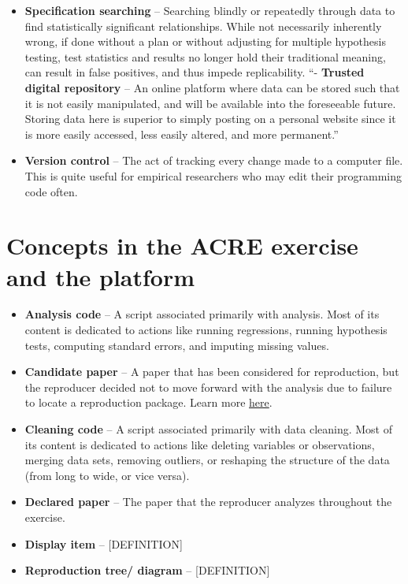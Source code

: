 \documentclass[]{book}
\providecommand{\tightlist}{%
  \setlength{\itemsep}{0pt}\setlength{\parskip}{0pt}}
\begin{document}
\begin{itemize}
\item
  \textbf{Specification searching} -- Searching blindly or repeatedly through data to find statistically significant relationships. While not necessarily inherently wrong, if done without a plan or without adjusting for multiple hypothesis testing, test statistics and results no longer hold their traditional meaning, can result in false positives, and thus impede replicability.
  ``- \textbf{Trusted digital repository} -- An online platform where data can be stored such that it is not easily manipulated, and will be available into the foreseeable future. Storing data here is superior to simply posting on a personal website since it is more easily accessed, less easily altered, and more permanent.''
\item
  \textbf{Version control} -- The act of tracking every change made to a computer file. This is quite useful for empirical researchers who may edit their programming code often.
\end{itemize}

\hypertarget{concepts-in-the-acre-exercise-and-the-platform}{%
\section{Concepts in the ACRE exercise and the platform}\label{concepts-in-the-acre-exercise-and-the-platform}}

\begin{itemize}
\tightlist
\item
  \textbf{Analysis code} -- A script associated primarily with analysis. Most of its content is dedicated to actions like running regressions, running hypothesis tests, computing standard errors, and imputing missing values.\\
\item
  \textbf{Candidate paper} -- A paper that has been considered for reproduction, but the reproducer decided not to move forward with the analysis due to failure to locate a reproduction package. Learn more \href{https://bitss.github.io/ACRE/scoping.html\#from-candidate-to-declared-paper}{here}.
\item
  \textbf{Cleaning code} -- A script associated primarily with data cleaning. Most of its content is dedicated to actions like deleting variables or observations, merging data sets, removing outliers, or reshaping the structure of the data (from long to wide, or vice versa).\\
\item
  \textbf{Declared paper} -- The paper that the reproducer analyzes throughout the exercise.
\item
  \textbf{Display item} -- {[}DEFINITION{]}\\
\item
  \textbf{Reproduction tree/ diagram} -- {[}DEFINITION{]}
\end{itemize}


\end{document}

